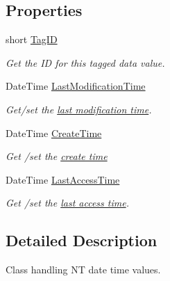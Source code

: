 \subsection*{Properties}
\begin{DoxyCompactItemize}
\item 
short \hyperlink{class_i_c_sharp_code_1_1_sharp_zip_lib_1_1_zip_1_1_n_t_tagged_data_ac1a14026c3e4f132303da31d01b00c6b}{Tag\+ID}
\begin{DoxyCompactList}\small\item\em Get the ID for this tagged data value. \end{DoxyCompactList}\item 
Date\+Time \hyperlink{class_i_c_sharp_code_1_1_sharp_zip_lib_1_1_zip_1_1_n_t_tagged_data_a1ed310ec9112eee071882e9a5a2c84ea}{Last\+Modification\+Time}
\begin{DoxyCompactList}\small\item\em Get/set the \hyperlink{}{last modification time}. \end{DoxyCompactList}\item 
Date\+Time \hyperlink{class_i_c_sharp_code_1_1_sharp_zip_lib_1_1_zip_1_1_n_t_tagged_data_a98240d3cb9c0669ff22ba1a119448a74}{Create\+Time}
\begin{DoxyCompactList}\small\item\em Get /set the \hyperlink{}{create time} \end{DoxyCompactList}\item 
Date\+Time \hyperlink{class_i_c_sharp_code_1_1_sharp_zip_lib_1_1_zip_1_1_n_t_tagged_data_a9a967e45a73f2819544205560671e997}{Last\+Access\+Time}
\begin{DoxyCompactList}\small\item\em Get /set the \hyperlink{}{last access time}. \end{DoxyCompactList}\end{DoxyCompactItemize}


\subsection{Detailed Description}
Class handling NT date time values. 




